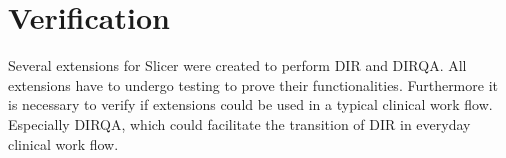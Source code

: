 \documentclass[type=dr, dr=rernat, accentcolor=tud7b,colorbacktitle, bigchapter, openright, twoside, 12pt ]{tudthesis}
\begin{document}
% 
% 
% 
% 
% 


\newpage
\section{Verification}
\label{Verification}

Several extensions for Slicer were created to perform DIR and DIRQA. All extensions have to undergo testing to prove their functionalities. Furthermore it is necessary to verify if extensions could be used in a typical clinical work flow.
Especially DIRQA, which could facilitate the transition of DIR in everyday clinical work flow.
\end{document}
